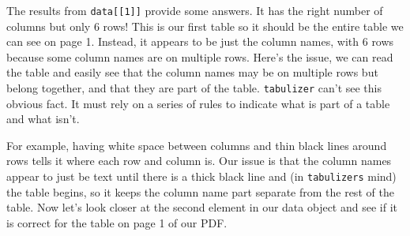 \documentclass[
]{krantz}
\begin{document}
The results from \texttt{data{[}{[}1{]}{]}} provide some
answers. It has the right number of columns but only 6 rows!
This is our first table so it should be the entire table we
can see on page 1. Instead, it appears to be just the column
names, with 6 rows because some column names are on multiple
rows. Here's the issue, we can read the table and easily see
that the column names may be on multiple rows but belong
together, and that they are part of the table.
\texttt{tabulizer} can't see this obvious fact. It must rely
on a series of rules to indicate what is part of a table and
what isn't.

For example, having white space between columns and thin
black lines around rows tells it where each row and column
is. Our issue is that the column names appear to just be
text until there is a thick black line and (in
\texttt{tabulizer\textquotesingle{}s} mind) the table
begins, so it keeps the column name part separate from the
rest of the table. Now let's look closer at the second
element in our data object and see if it is correct for the
table on page 1 of our PDF.
\end{document}

